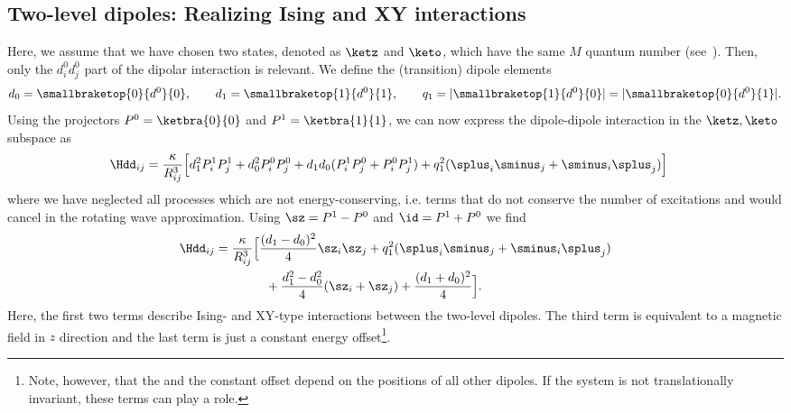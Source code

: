 \subsection{Two-level dipoles: Realizing Ising and XY interactions}
Here, we assume that we have chosen two states, denoted as $\ketz$ and $\keto$, which have the
same $M$ quantum number (see~).
Then, only the $d^0_id^0_j$ part of the dipolar interaction is relevant.
We define the (transition) dipole elements
\begin{align}
    d_0 = \smallbraketop{0}{d^0}{0},\qquad
    d_1 = \smallbraketop{1}{d^0}{1},\qquad
    q_1 = |\smallbraketop{1}{d^0}{0}| = |\smallbraketop{0}{d^0}{1}|.
\end{align}
Using the projectors $P^0 = \ketbra{0}{0}$ and $P^1 = \ketbra{1}{1}$, we can now express the
dipole-dipole interaction  in the $\ketz, \keto$ subspace as
\begin{align}
    \Hdd_{ij} &= \frac{\kappa}{R_{ij}^3} \Big[ d_1^2 P^1_i P^1_j + d_0^2 P^0_i P^0_j + d_1d_0 (P^1_i P^0_j + P^0_i P^1_j)
              + q_1^2 (\splus_i \sminus_j + \sminus_i \splus_j) \Big]
\end{align}
where we have neglected all processes which are not energy-conserving,
i.e. terms that do not conserve the number of excitations and would cancel in the rotating wave approximation.
Using $\sz = P^1 - P^0$ and $\id = P^1 + P^0$ we find
\begin{align}
    \Hdd_{ij} &= \frac{\kappa}{R_{ij}^3} \Big[ \frac{(d_1-d_0)^2}{4} \sz_i \sz_j  + q_1^2 (\splus_i \sminus_j + \sminus_i \splus_j)\\
              &\qquad\qquad + \frac{d_1^2 - d_0^2}{4} (\sz_i + \sz_j)  + \frac{(d_1+d_0)^2}{4} \Big].
\end{align}
Here, the first two terms describe Ising- and XY-type interactions between the two-level dipoles. The third term is equivalent to a magnetic field in $z$ direction and the last term is just a constant energy offset\footnote{Note, however, that the  and the constant offset depend on the positions of all other dipoles. If the system is not translationally invariant, these terms can play a role.}.

